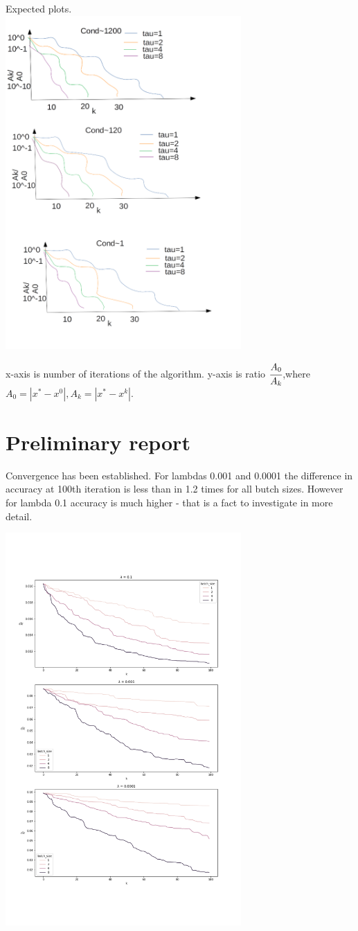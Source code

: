 \documentclass{article}
\begin{document}
Expected plots.\\  
\includegraphics[width=90mm]{sketch.png}

x-axis is number of iterations of the algorithm. y-axis is ratio $\cfrac{A_0}{A_k}$,where $A_0 = |x^*-x^0|, A_k = |x^*-x^k|$.

\section{Preliminary report}
Convergence has been established. For lambdas 0.001 and 0.0001 the difference in accuracy at 100th iteration is less than in 1.2 times for all butch sizes. However for lambda 0.1 accuracy is much higher - that is a fact to investigate in more detail.

\includegraphics[width=90mm]{plot.png}
\end{document}
